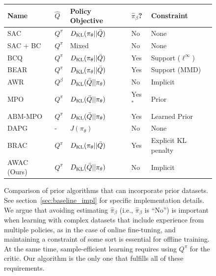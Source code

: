 \documentclass[conference]{IEEEtran}
\begin{document}
\begin{figure}[H]
    \begin{centering}
        \footnotesize
        \begin{tabular}{ l||l|l|l|l  }
            Name & $\hat{Q}$ & Policy Objective & $\hat{\pi}_\beta$? & Constraint \\
            \hline
            SAC    & $Q^\pi$   & $D_{\mathrm{KL}}(\pi_\theta||\bar{Q})$   & No   &  None            \\
            SAC + BC & $Q^\pi$   & Mixed   & No   &  None            \\
            BCQ    & $Q^\pi$   & $D_{\mathrm{KL}}(\pi_\theta||\bar{Q})$   & Yes   &  Support ($\ell^\infty$)  \\
            BEAR   & $Q^\pi$   & $D_{\mathrm{KL}}(\pi_\theta||\bar{Q})$   & Yes   &  Support (MMD)   \\
            AWR    & $Q^\beta$ & $D_{\mathrm{KL}}(\bar{Q}||\pi_\theta)$   & No   &  Implicit        \\
            MPO    & $Q^\pi$   & $D_{\mathrm{KL}}(\bar{Q}||\pi_\theta)$   & Yes$^*$   &  Prior   \\
            ABM-MPO    & $Q^\pi$   & $D_{\mathrm{KL}}(\bar{Q}||\pi_\theta)$   & Yes   &  Learned Prior   \\
            DAPG   & -         & $J(\pi_\theta)$   & No   &  None            \\
            BRAC   & $Q^\pi$   & $D_{\mathrm{KL}}(\pi_\theta||\bar{Q})$   & Yes   &  Explicit KL penalty   \\
            AWAC (Ours)   & $Q^\pi$   & $D_{\mathrm{KL}}(\bar{Q}||\pi_\theta)$  & No    &  Implicit
        \end{tabular}
    \end{centering}
    
    \caption{Comparison of prior algorithms that can incorporate prior datasets. See section~\ref{sec:baseline_impl} for specific implementation details. We argue that avoiding estimating $\hat{\pi}_\beta$ (i.e., $\hat{\pi}_\beta$ is ``No'') is important when learning with complex datasets that include experience from multiple policies, as in the case of online fine-tuning, and maintaining a constraint of some sort is essential for offline training. At the same time, sample-efficient learning requires using $Q^\pi$ for the critic. Our algorithm is the only one that fulfills all of these requirements.}
    \label{fig:algo_table}
\end{figure}
\end{document}
